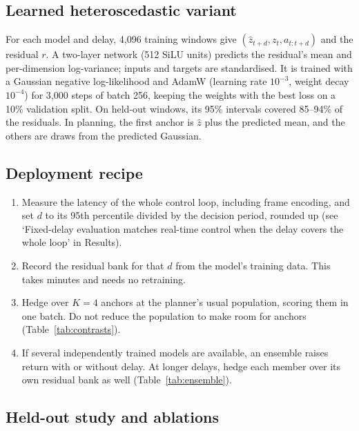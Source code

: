 \documentclass[pdflatex,sn-nature]{sn-jnl}%
\begin{document}
\subsection{Learned heteroscedastic variant}\label{sec:learned}

For each model and delay, 4,096 training windows give $(\hat z_{t+d}, z_t, a_{t:t+d})$ and the residual $r$. A two-layer network (512 SiLU units) predicts the residual's mean and per-dimension log-variance; inputs and targets are standardised. It is trained with a Gaussian negative log-likelihood and AdamW (learning rate $10^{-3}$, weight decay $10^{-4}$) for 3,000 steps of batch 256, keeping the weights with the best loss on a 10\% validation split. On held-out windows, its 95\% intervals covered 85--94\% of the residuals. In planning, the first anchor is $\hat z$ plus the predicted mean, and the others are draws from the predicted Gaussian.

\subsection{Deployment recipe}\label{sec:recipe}

\begin{enumerate}[1.]
\item Measure the latency of the whole control loop, including frame encoding, and set $d$ to its 95th percentile divided by the decision period, rounded up (see `Fixed-delay evaluation matches real-time control when the delay covers the whole loop' in Results).
\item Record the residual bank for that $d$ from the model's training data. This takes minutes and needs no retraining.
\item Hedge over $K=4$ anchors at the planner's usual population, scoring them in one batch. Do not reduce the population to make room for anchors (Table~\ref{tab:contrasts}).
\item If several independently trained models are available, an ensemble raises return with or without delay. At longer delays, hedge each member over its own residual bank as well (Table~\ref{tab:ensemble}).
\end{enumerate}

\subsection{Held-out study and ablations}\label{sec:heldout-methods}
\end{document}
